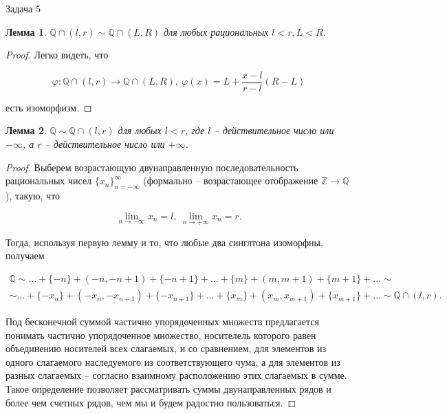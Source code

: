 \documentclass{article}
\newtheorem{lemma}{Лемма}
\newcommand{\Q}{\mathbb{Q}}
\begin{document}
	\begin{section}{Задача 5}
		\begin{lemma}
			$\Q \cap (l, r) \sim \Q \cap (L, R)$ для любых рациональных $l < r, L < R$.
		\end{lemma}

		\begin{proof}
			Легко видеть, что

			\begin{equation*}
				\varphi: \Q \cap (l, r) \to \Q \cap (L, R), \ \varphi(x) = L + \frac{x - l}{r - l} (R - L)
			\end{equation*}

			есть изоморфизм.
		\end{proof}

		\begin{lemma}
			$\Q \sim \Q \cap (l, r)$ для любых $l < r$, где $l$ -- действительное число или $-\infty$, а $r$ -- действительное число или $+\infty$.
		\end{lemma}

		\begin{proof}
			Выберем возрастающую двунаправленную последовательность рациональных чисел $\{x_n\}_{n=-\infty}^\infty$ (формально -- возрастающее отображение $\mathbb{Z} \to \Q$), такую, что

			\begin{equation*}
				\lim_{n \to -\infty} x_n = l, \ \lim_{n \to +\infty} x_n = r.
			\end{equation*}

			Тогда, используя первую лемму и то, что любые два синглтона изоморфны, получаем

			\begin{multline*}
				\Q \sim \dots + \{-n\} + (-n, -n+1) + \{-n+1\} + \dots + \{m\} + (m, m+1) + \{m+1\} + \dots \sim \\
				\sim \dots + \{-x_n\} + (-x_n, -x_{n+1}) + \{-x_{n+1}\} + \dots + \{x_m\} + (x_m, x_{m+1}) + \{x_{m+1}\} + \dots \sim \Q \cap (l, r).
			\end{multline*}

			Под бесконечной суммой частично упорядоченных множеств предлагается понимать частично упорядоченное множество, носителель которого равен объединению носителей всех слагаемых, и со сравнением, для элементов из одного слагаемого наследуемого из соответствующего чума, а для элементов из разных слагаемых -- согласно взаимному расположению этих слагаемых в сумме. Такое определение позволяет рассматривать суммы двунаправленных рядов и более чем счетных рядов, чем мы и будем радостно пользоваться.
		\end{proof}


\end{section}
\end{document}
